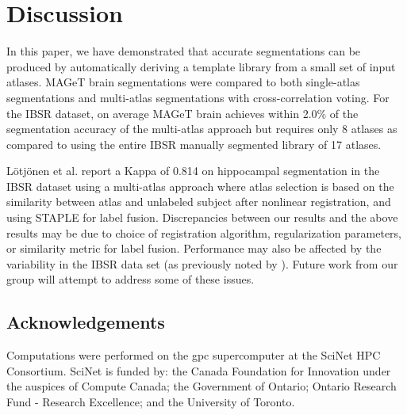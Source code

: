 \documentclass{article}
\newcommand{\magetbrain}{MAGeT brain }
\begin{document}
\section{Discussion}

In this paper, we have demonstrated that accurate segmentations can be produced
by automatically deriving a template library from a small set of input atlases.
\magetbrain segmentations were compared to both single-atlas segmentations and
multi-atlas segmentations with cross-correlation voting.  For the IBSR dataset,
on average \magetbrain achieves within 2.0\% of the segmentation accuracy of
the multi-atlas approach but requires only 8 atlases as compared to using the
entire IBSR manually segmented library of 17 atlases.

L\"{o}tj\"{o}nen et al.\cite{Lotjonen2010} report a Kappa of 0.814 on
hippocampal segmentation in the IBSR dataset using a multi-atlas approach where
atlas selection is based on the similarity between atlas and unlabeled subject
after nonlinear registration, and using STAPLE\cite{Warfield2004} for label
fusion.  Discrepancies between our results and the above results may be due to
choice of registration algorithm, regularization parameters, or similarity
metric for label fusion.  Performance may also be affected by the variability
in the IBSR data set (as previously noted by \cite{Klein2009}).  Future work
from our group will attempt to address some of these issues.

\subsection{Acknowledgements}
Computations were performed on the gpc supercomputer at the SciNet HPC
Consortium\cite{Loken2010}. SciNet is funded by: the Canada Foundation for
Innovation under the auspices of Compute Canada; the Government of Ontario;
Ontario Research Fund - Research Excellence; and the University of Toronto.



\end{document}
